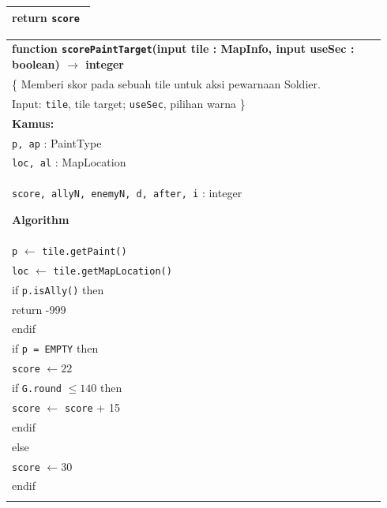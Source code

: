 \documentclass{article}
\newenvironment{pseudobox}
{
\centering
\begin{longtable}{|p{0.94\linewidth}|}
\hline
}
{
\\ \hline
\end{longtable}
\vspace{0.05cm}
}
\begin{document}
\begin{enumerate}[label=\alph*.]
\begin{enumerate}[label=\alph*.]
\begin{pseudobox}
\hspace*{1.5em}return \texttt{score}
\end{pseudobox}

\begin{pseudobox}
\textbf{function \texttt{scorePaintTarget}(input tile : MapInfo, input useSec : boolean) $\rightarrow$ integer} \\
\{ Memberi skor pada sebuah tile untuk aksi pewarnaan Soldier. \\
Input: \texttt{tile}, tile target; \texttt{useSec}, pilihan warna
\} \\

\textbf{Kamus:} \\
\hspace*{1.5em}\texttt{p, ap} : PaintType \\
\hspace*{1.5em}\texttt{loc, al} : MapLocation \\
\hspace*{1.5em}\texttt{score, allyN, enemyN, d, after, i} : integer

\textbf{Algorithm} \\
\hspace*{1.5em}\texttt{p} $\leftarrow$ \texttt{tile.getPaint()} \\
\hspace*{1.5em}\texttt{loc} $\leftarrow$ \texttt{tile.getMapLocation()} \\

\hspace*{1.5em}if \texttt{p.isAlly()} then \\
\hspace*{3em}return -999 \\
\hspace*{1.5em}endif \\

\hspace*{1.5em}if \texttt{p = EMPTY} then \\
\hspace*{3em}\texttt{score} $\leftarrow 22$ \\
\hspace*{3em}if \texttt{G.round} $\leq 140$ then \\
\hspace*{4.5em}\texttt{score} $\leftarrow$ \texttt{score} + 15 \\
\hspace*{3em}endif \\
\hspace*{1.5em}else \\
\hspace*{3em}\texttt{score} $\leftarrow 30$ \\
\hspace*{1.5em}endif \\


\end{pseudobox}
\end{enumerate}
\end{enumerate}
\end{document}
